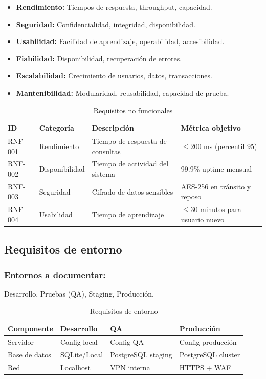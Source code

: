 \documentclass[a4paper,11pt,spanish]{article}
\begin{document}
\begin{itemize}
    \item \textbf{Rendimiento:} Tiempos de respuesta, throughput, capacidad.
    \item \textbf{Seguridad:} Confidencialidad, integridad, disponibilidad.
    \item \textbf{Usabilidad:} Facilidad de aprendizaje, operabilidad, accesibilidad.
    \item \textbf{Fiabilidad:} Disponibilidad, recuperación de errores.
    \item \textbf{Escalabilidad:} Crecimiento de usuarios, datos, transacciones.
    \item \textbf{Mantenibilidad:} Modularidad, reusabilidad, capacidad de prueba.
\end{itemize}

\begin{table}[H]
\centering
\caption{Requisitos no funcionales}
\label{tab:req-no-funcionales}
\begin{tabular}{@{}llll@{}}
\toprule
\textbf{ID} & \textbf{Categoría} & \textbf{Descripción} & \textbf{Métrica objetivo} \\
\midrule
RNF-001 & Rendimiento & Tiempo de respuesta de consultas & $\le$200 ms (percentil 95) \\
RNF-002 & Disponibilidad & Tiempo de actividad del sistema & 99.9\% uptime mensual \\
RNF-003 & Seguridad & Cifrado de datos sensibles & AES-256 en tránsito y reposo \\
RNF-004 & Usabilidad & Tiempo de aprendizaje & $\le$30 minutos para usuario nuevo \\
\bottomrule
\end{tabular}
\end{table}

\subsection{Requisitos de entorno}

\subsubsection*{Entornos a documentar:} Desarrollo, Pruebas (QA), Staging, Producción.

\begin{table}[H]
\centering
\caption{Requisitos de entorno}
\label{tab:req-entorno}
\begin{tabular}{@{}llll@{}}
\toprule
\textbf{Componente} & \textbf{Desarrollo} & \textbf{QA} & \textbf{Producción} \\
\midrule
Servidor & Config local & Config QA & Config producción \\
Base de datos & SQLite/Local & PostgreSQL staging & PostgreSQL cluster \\
Red & Localhost & VPN interna & HTTPS + WAF \\
\bottomrule
\end{tabular}
\end{table}
\end{document}
